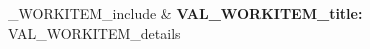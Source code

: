 %
\ifVAL_WORKITEM_include%
        & \textbf{VAL_WORKITEM_title:}%
        VAL_WORKITEM_details%
        \\%
        \fi%
